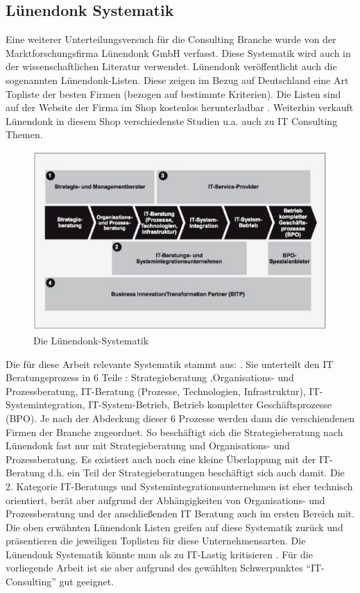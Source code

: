 \subsection{Lünendonk Systematik}
Eine weiterer Unterteilungsversuch für die Consulting Branche wurde von der Marktforschungsfirma Lünendonk GmbH verfasst.
Diese Systematik wird auch in der wissenschaftlichen Literatur \cite[56]{Lippold201309} verwendet. Lünendonk veröffentlicht
auch die sogenannten Lünendonk-Listen. Diese zeigen im Bezug auf Deutschland eine Art Topliste der besten Firmen (bezogen auf bestimmte Kriterien).
Die Listen sind auf der Website der Firma im Shop kostenlos herunterladbar \cite {topBITP} . Weiterhin verkauft Lünendonk in diesem Shop verschiedenste Studien u.a.
auch zu IT Consulting Themen.

\begin{figure}[H]
\center
\includegraphics[width=13cm]{./images/luene.jpg}
\caption{Die Lünendonk-Systematik}
\end{figure}

Die für diese Arbeit relevante Systematik stammt aus: \cite[56]{Lippold201309}. Sie unterteilt den IT Beratungsprozess in 6 Teile :  Strategieberatung ,Organisations- und Prozessberatung, IT-Beratung (Prozesse, Technologien, Infrastruktur), IT-Systemintegration, IT-System-Betrieb, Betrieb kompletter Geschäftsprozesse (BPO). Je nach der Abdeckung dieser 6 Prozesse werden dann die verschiendenen Firmen der Branche zugeordnet. So beschäftigt sich die Strategieberatung nach Lünendonk fast nur mit Strategieberatung und Organisations- und Prozessberatung. Es existiert auch noch eine kleine Überlappung mit der IT-Beratung d.h. ein Teil der Strategieberatungen beschäftigt sich auch damit. Die 2. Kategorie IT-Beratungs und Systemintegrationsunternehmen ist eher technisch orientiert, berät aber aufgrund der Abhängigkeiten von Organisations- und Prozessberatung und der anschließenden IT Beratung auch im ersten Bereich mit. Die oben erwähnten Lünendonk Listen greifen auf diese Systematik zurück und präsentieren die jeweiligen \glqq Toplisten \grqq für diese Unternehmensarten. Die Lünendonk Systematik könnte man als zu IT-Lastig kritisieren \cite[56]{Lippold201309} . Für die vorliegende Arbeit ist sie aber aufgrund des gewählten Schwerpunktes ``IT- Consulting'' gut geeignet.


